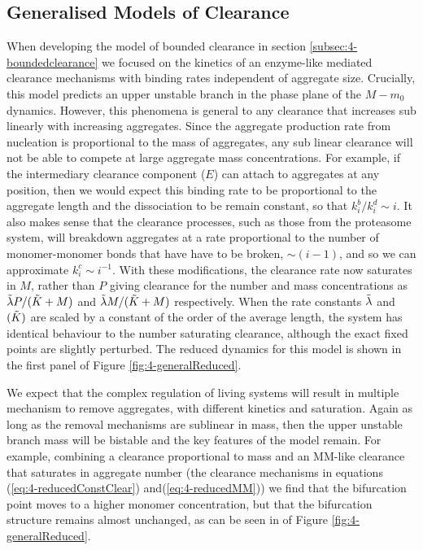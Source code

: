 \subsection{Generalised Models of Clearance}

When developing the model of bounded clearance in section \ref{subsec:4-boundedclearance} we focused on the kinetics of an enzyme-like mediated clearance mechanisms with binding rates independent of aggregate size. Crucially, this model predicts an upper unstable branch in the phase plane of the $M-m_0$ dynamics. However, this phenomena is general to any clearance that increases sub linearly with increasing aggregates. Since the aggregate production rate from nucleation is proportional to the mass of aggregates, any sub linear clearance will not be able to compete at large aggregate mass concentrations. For example, if the intermediary clearance component ($E$) can attach to aggregates at any position, then we would expect this binding rate to be proportional to the aggregate length and the dissociation to be remain constant, so that ${k_i^b}/{k_i^d}\sim i$. It also makes sense that the clearance processes, such as those from the proteasome system, will breakdown aggregates at a rate proportional to the number of monomer-monomer bonds that have have to be broken, $\sim(i-1)$, and so we can approximate $k_i^{c} \sim i^{-1}$. With these modifications, the clearance rate now saturates in $M$, rather than $P$ giving clearance for the number and mass concentrations as $\Tilde{\lambda}P/(\Tilde{K}+M)$ and $\Tilde{\lambda}M/(\Tilde{K}+M)$ respectively. When the rate constants $\Tilde{\lambda}$ and $(\Tilde{K})$ are scaled by a constant of the order of the average length, the system has identical behaviour to the number saturating clearance, although the exact fixed points are slightly perturbed. The reduced dynamics for this model is shown in the first panel of Figure \ref{fig:4-generalReduced}.

We expect that the complex regulation of living systems will result in multiple mechanism to remove aggregates, with different kinetics and saturation. Again as long as the removal mechanisms are sublinear in mass, then the upper unstable branch mass will be bistable and the key features of the model remain. For example, combining a clearance proportional to mass and an MM-like clearance that saturates in aggregate number (the clearance mechanisms in equations (\ref{eq:4-reducedConstClear}) and(\ref{eq:4-reducedMM})) we find that the bifurcation point moves to a higher monomer concentration, but that the bifurcation structure remains almost unchanged, as can be seen in  of Figure \ref{fig:4-generalReduced}.

